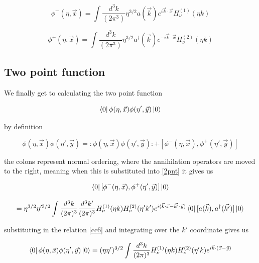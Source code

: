 \documentclass[a4paper,11pt]{article}
\numberwithin{equation}{section}
\numberwithin{figure}{section}
\begin{document}
\begin{large}
\begin{equation}
\label{quantphi-}    
    \phi^-(\eta,\Vec{x})=\int \frac{d^3k}{(2\pi^3)}\eta^{3/2}a(\Vec{k})e^{i\Vec{k}\cdot\Vec{x}}H_\nu^{(1)}(\eta k)
\end{equation}

\begin{equation}
\label{quantphi+}    
    \phi^+(\eta,\Vec{x})=\int \frac{d^3k}{(2\pi^3)}\eta^{3/2}a^\dagger(\Vec{k})e^{-i\Vec{k}\cdot\Vec{x}}H_\nu^{(2)}(\eta k)
\end{equation}

\newpage

\subsection{Two point function}

We finally get to calculating the two point function

\begin{equation}
\label{2pnt}    
    \bra{0}\phi(\eta,\Vec{x})\phi(\eta',\Vec{y})\ket{0}
\end{equation}

by definition 

\begin{equation}
\label{normalorder and com}    
    \phi(\eta,\Vec{x})\phi(\eta',\Vec{y})=:\phi(\eta,\Vec{x})\phi(\eta',\Vec{y}):+[\phi^-(\eta,\Vec{x}),\phi^+(\eta',\Vec{y})]
\end{equation}

the colons represent normal ordering, where the annihilation operators are moved to the right, meaning when this is substituted into \eqref{2pnt} it gives us

\begin{equation}
\label{2point}    
    \bra{0}[\phi^-(\eta,\Vec{x}),\phi^+(\eta',\Vec{y})]\ket{0}
\end{equation}

\begin{equation}
\label{2pointcalc}
    =\eta^{3/2}\eta'^{3/2}\int \frac{d^3k}{(2\pi)^3}\frac{d^3k'}{(2\pi)^3}H^{(1)}_\nu(\eta k)H^{(2)}_\nu(\eta'k')e^{i(\Vec{k}\cdot\Vec{x}-\Vec{k'}\cdot\Vec{y})}\bra{0}[a(\Vec{k}),a^\dagger(\Vec{k'})]\ket{0}
\end{equation}

substituting in the relation \eqref{cc6} and integrating over the $k'$ coordinate gives us

\begin{equation}
\label{2pointsol}    
    \bra{0} \phi(\eta,\Vec{x})\phi(\eta',\Vec{y})\ket{0}=(\eta\eta')^{3/2}\int \frac{d^3k}{(2\pi)^3}H^{(1)}_\nu(\eta k)H^{(2)}_\nu(\eta'k)e^{i\Vec{k}\cdot(\Vec{x}-\Vec{y})}
\end{equation}


\end{large}
\end{document}
